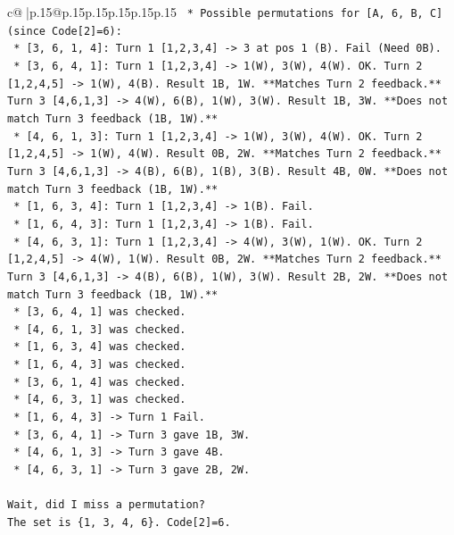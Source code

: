 \documentclass{article}
\begin{document}
{\begin{supertabular}{c@{$\;$}|p{.15\linewidth}@{}p{.15\linewidth}p{.15\linewidth}p{.15\linewidth}p{.15\linewidth}p{.15\linewidth}}
{{{\texttt{    *   Possible permutations for {[}A, 6, B, C{]} (since Code{[}2{]}=6):} \\
\texttt{        *   {[}3, 6, 1, 4{]}: Turn 1 {[}1,2,3,4{]} {-}> 3 at pos 1 (B). Fail (Need 0B).} \\
\texttt{        *   {[}3, 6, 4, 1{]}: Turn 1 {[}1,2,3,4{]} {-}> 1(W), 3(W), 4(W). OK. Turn 2 {[}1,2,4,5{]} {-}> 1(W), 4(B). Result 1B, 1W. **Matches Turn 2 feedback.** Turn 3 {[}4,6,1,3{]} {-}> 4(W), 6(B), 1(W), 3(W). Result 1B, 3W. **Does not match Turn 3 feedback (1B, 1W).**} \\
\texttt{        *   {[}4, 6, 1, 3{]}: Turn 1 {[}1,2,3,4{]} {-}> 1(W), 3(W), 4(W). OK. Turn 2 {[}1,2,4,5{]} {-}> 1(W), 4(W). Result 0B, 2W. **Matches Turn 2 feedback.** Turn 3 {[}4,6,1,3{]} {-}> 4(B), 6(B), 1(B), 3(B). Result 4B, 0W. **Does not match Turn 3 feedback (1B, 1W).**} \\
\texttt{        *   {[}1, 6, 3, 4{]}: Turn 1 {[}1,2,3,4{]} {-}> 1(B). Fail.} \\
\texttt{        *   {[}1, 6, 4, 3{]}: Turn 1 {[}1,2,3,4{]} {-}> 1(B). Fail.} \\
\texttt{        *   {[}4, 6, 3, 1{]}: Turn 1 {[}1,2,3,4{]} {-}> 4(W), 3(W), 1(W). OK. Turn 2 {[}1,2,4,5{]} {-}> 4(W), 1(W). Result 0B, 2W. **Matches Turn 2 feedback.** Turn 3 {[}4,6,1,3{]} {-}> 4(B), 6(B), 1(W), 3(W). Result 2B, 2W. **Does not match Turn 3 feedback (1B, 1W).**} \\
\texttt{        *   {[}3, 6, 4, 1{]} was checked.} \\
\texttt{        *   {[}4, 6, 1, 3{]} was checked.} \\
\texttt{        *   {[}1, 6, 3, 4{]} was checked.} \\
\texttt{        *   {[}1, 6, 4, 3{]} was checked.} \\
\texttt{        *   {[}3, 6, 1, 4{]} was checked.} \\
\texttt{        *   {[}4, 6, 3, 1{]} was checked.} \\
\texttt{        *   {[}1, 6, 4, 3{]} {-}> Turn 1 Fail.} \\
\texttt{        *   {[}3, 6, 4, 1{]} {-}> Turn 3 gave 1B, 3W.} \\
\texttt{        *   {[}4, 6, 1, 3{]} {-}> Turn 3 gave 4B.} \\
\texttt{        *   {[}4, 6, 3, 1{]} {-}> Turn 3 gave 2B, 2W.} \\
\\ 
\texttt{Wait, did I miss a permutation?} \\
\texttt{The set is \{1, 3, 4, 6\}. Code{[}2{]}=6.} \\
}}}
\end{supertabular}}
\end{document}
